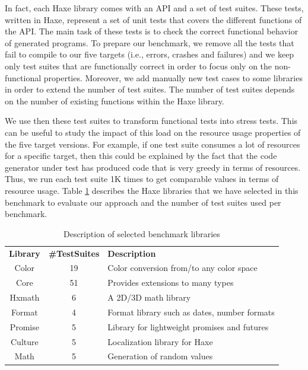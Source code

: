 In fact, each Haxe library comes with an API and a set of test suites. These tests, written in Haxe, represent a set of unit tests that covers the different functions of the API. The main task of these tests is to check the correct functional behavior of generated programs. To prepare our benchmark, we remove all the tests that fail to compile to our five targets (i.e., errors, crashes and failures) and we keep only test suites that are functionally correct in order to focus only on the non-functional properties.
Moreover, we add manually new test cases to some libraries in order to extend the number of test suites. The number of test suites depends on the number of existing functions within the Haxe library.

We use then these test suites to transform functional tests into stress tests. This can be useful to study the impact of this load on the resource usage properties of the five target versions. For example, if one test suite consumes a lot of resources for a specific target, then this could be explained by the fact that the code generator under test has produced code that is very greedy in terms of resources.
Thus, we run each test suite 1K times to get comparable values in terms of resource usage.
Table \ref{tab:Description of selected benchmark libraries} describes the Haxe libraries that we have selected in this benchmark to evaluate our
approach and the number of test suites used per benchmark.

\begin{table}[h]
	\centering
	
		\begin{tabular}{|c|c|p{8.5cm}|}				
			\hline
			\textbf{Library} & \textbf{\#TestSuites} & \textbf{Description} \\
			\hhline{|=|=|=|}
			Color  &  19 &  Color conversion from/to any color space   \\ \hline
			Core & 51  & Provides extensions to many types  \\ \hline
			Hxmath & 6  & A 2D/3D math library  \\ \hline
			Format  &  4 & Format library such as dates, number formats   \\ \hline
			Promise & 5  & Library for lightweight promises and futures  \\ \hline
			Culture & 5  & Localization library for Haxe \\ \hline
			Math & 5  & Generation of random values \\ \hline
		\end{tabular}
	
	\caption{Description of selected benchmark libraries}
	\label{tab:Description of selected benchmark libraries}
\end{table}

